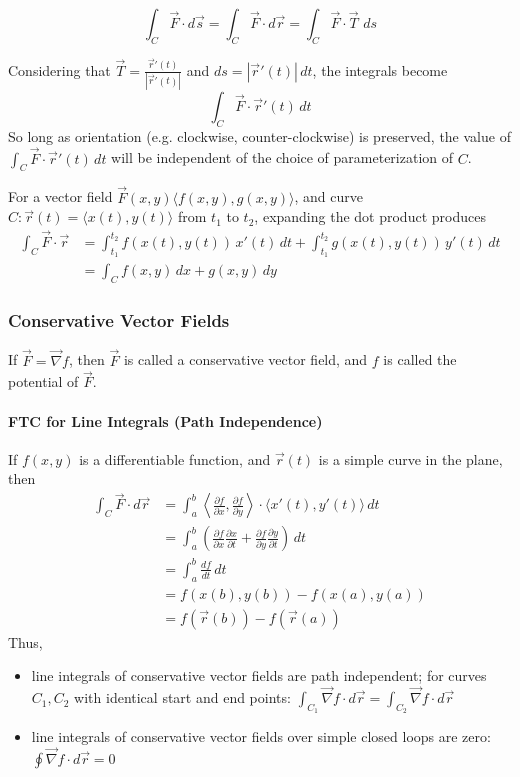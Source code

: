 \documentclass{article}
\newcommand{\vect}[1]{\ensuremath{\overrightarrow{#1}}}
\begin{document}
$$\int_C\vect{F}\cdot d\vect{s}=\int_C\vect{F}\cdot d\vect{r}=\int_C\vect{F}\cdot\vect{T}\,\,ds$$

Considering that $\vect{T}=\frac{\vect{r}'(t)}{\left|\vect{r}'(t)\right|}$ and $ds = \left|\vect{r}'(t)\right|\,dt$, the integrals become
$$\int_C\vect{F}\cdot\vect{r}'(t)\,dt$$
So long as orientation (e.g. clockwise, counter-clockwise) is preserved, the value of $\int_C\vect{F}\cdot\vect{r}'(t)\,dt$ will be independent of the choice of parameterization of $C$.

For a vector field $\vect{F}(x,y)\langle f(x,y), g(x,y) \rangle$, and curve $C: \vect{r}(t)=\langle x(t),y(t) \rangle$ from $t_1$ to $t_2$, expanding the dot product produces
\begin{align*}
    \int_C\vect{F} \cdot \vect{r}&=\int_{t_1}^{t_2} f(x(t),y(t))\,x'(t)\,dt+\int_{t_1}^{t_2}g(x(t),y(t))\,y'(t)\,dt\\
    &=\int_C f(x,y)\,dx+g(x,y)\,dy
\end{align*}

\subsubsection{Conservative Vector Fields}
If $\vect{F}=\vect{\nabla}f$, then $\vect{F}$ is called a conservative vector field, and $f$ is called the potential of $\vect{F}$.

\paragraph{FTC for Line Integrals (Path Independence)}
If $f(x,y)$ is a differentiable function, and $\vect{r}(t)$ is a simple curve in the plane, then
\begin{align*}
    \int_C\vect{F}\cdot d\vect{r} &= \int_a^b\left\langle\frac{\partial f}{\partial x}, \frac{\partial f}{\partial y}\right\rangle\cdot\langle x'(t),y'(t) \rangle\,dt\\
    &= \int_a^b\left(\frac{\partial f}{\partial x}\frac{\partial x}{\partial t} + \frac{\partial f}{\partial y}\frac{\partial y}{\partial t}\right)\,dt\\
    &=\int_a^b \frac{df}{dt}\,dt\\
    &= f(x(b),y(b)) - f(x(a),y(a))\\
    &= f(\vect{r}(b)) - f(\vect{r}(a))
\end{align*}
Thus,
\begin{itemize}
    \item line integrals of conservative vector fields are path independent; for curves $C_1,C_2$ with identical start and end points: $\int_{C_1}\vect{\nabla}f\cdot d\vect{r} = \int_{C_2}\vect{\nabla}f\cdot d\vect{r}$
    \item line integrals of conservative vector fields over simple closed loops are zero: $\oint \vect{\nabla}f\cdot d\vect{r} = 0$
\end{itemize}
\end{document}
